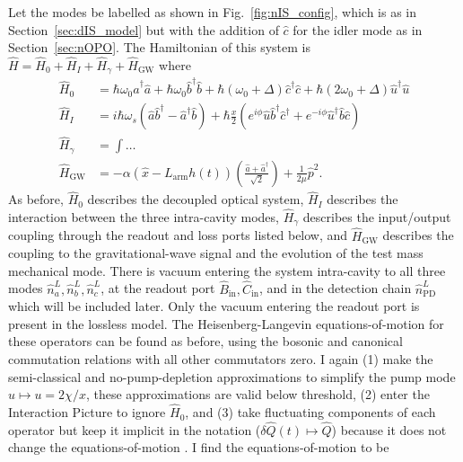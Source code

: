 Let the modes be labelled as shown in Fig.~\ref{fig:nIS_config}, which is as in Section~\ref{sec:dIS_model} but with the addition of $\hat c$ for the idler mode as in Section~\ref{sec:nOPO}. The Hamiltonian of this system is $\hat H = \hat H_0 + \hat H_I + \hat H_\gamma + \hat H_\text{GW}$ where~\cite{} 
\begin{align}
\hat H_0 &= \hbar \omega_0 \hat a^\dag \hat a + \hbar \omega_0 \hat b^\dag \hat b+ \hbar (\omega_0+\Delta) \hat c^\dag \hat c + \hbar (2\omega_0+\Delta) \hat u^\dag \hat u\\
\hat H_I &= i\hbar\omega_s(\hat a\hat b^\dag-\hat a^\dag\hat b) + \hbar \frac{x}{2} (e^{i\phi} \hat u \hat b^\dag \hat c^\dag+e^{-i\phi} \hat u^\dag \hat b \hat c) \\
\hat H_\gamma &= \int \ldots \\
\hat H_\text{GW} &= -\alpha (\hat{x}-L_\mathrm{arm}h(t))\left(\frac{\hat{a}+\hat{a}^\dag}{\sqrt{2}}\right)+\frac{1}{2\mu}\hat{p}^2.
\end{align}
As before, $\hat H_0$ describes the decoupled optical system, $\hat H_I$ describes the interaction between the three intra-cavity modes, $\hat H_\gamma$ describes the input/output coupling through the readout and loss ports listed below, and $\hat H_\text{GW}$ describes the coupling to the gravitational-wave signal and the evolution of the test mass mechanical mode.
There is vacuum entering the system intra-cavity to all three modes $\hat n^L_a, \hat n^L_b, \hat n^L_c$, at the readout port $\hat B_\text{in}, \hat C_\text{in}$, and in the detection chain $\hat n^L_\text{PD}$ which will be included later. Only the vacuum entering the readout port is present in the lossless model.
The Heisenberg-Langevin equations-of-motion for these operators can be found as before, using the bosonic and canonical commutation relations with all other commutators zero. I again (1) make the semi-classical and no-pump-depletion approximations to simplify the pump mode $\hat u\mapsto u=2\chi/x$, these approximations are valid below threshold, (2) enter the Interaction Picture to ignore $\hat H_0$, and (3) take fluctuating components of each operator but keep it implicit in the notation ($\delta\hat{Q}(t)\mapsto\hat{Q}$) because it does not change the equations-of-motion . I find the equations-of-motion to be
